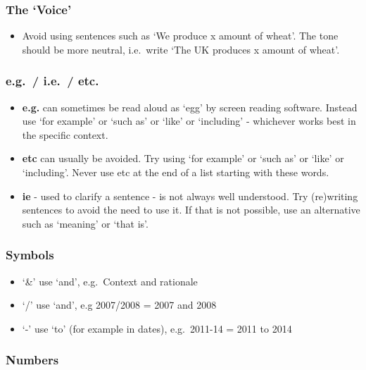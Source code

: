 \documentclass[
]{book}
\providecommand{\tightlist}{%
  \setlength{\itemsep}{0pt}\setlength{\parskip}{0pt}}
\begin{document}
\hypertarget{the-voice}{%
\subsubsection{The `Voice'}\label{the-voice}}

\begin{itemize}
\tightlist
\item
  Avoid using sentences such as `We produce x amount of wheat'. The tone should be more neutral, i.e.~write `The UK produces x amount of wheat'.
\end{itemize}

\hypertarget{e.g.-i.e.-etc.}{%
\subsubsection{e.g.~/ i.e.~/ etc.}\label{e.g.-i.e.-etc.}}

\begin{itemize}
\tightlist
\item
  \textbf{e.g.} can sometimes be read aloud as `egg' by screen reading software. Instead use `for example' or `such as' or `like' or `including' - whichever works best in the specific context.
\item
  \textbf{etc} can usually be avoided. Try using `for example' or `such as' or `like' or `including'. Never use etc at the end of a list starting with these words.
\item
  \textbf{ie} - used to clarify a sentence - is not always well understood. Try (re)writing sentences to avoid the need to use it. If that is not possible, use an alternative such as `meaning' or `that is'.
\end{itemize}

\hypertarget{symbols}{%
\subsubsection{Symbols}\label{symbols}}

\begin{itemize}
\tightlist
\item
  `\&' use `and', e.g.~Context and rationale
\item
  `/' use `and', e.g 2007/2008 = 2007 and 2008
\item
  `-' use `to' (for example in dates), e.g.~2011-14 = 2011 to 2014
\end{itemize}

\hypertarget{numbers}{%
\subsubsection{Numbers}\label{numbers}}
\end{document}
